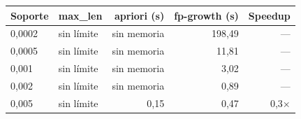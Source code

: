 \begin{tabular}{llrrr}
\toprule
\textbf{Soporte} & \textbf{max\_len} & \textbf{apriori (s)} & \textbf{fp-growth (s)} & \textbf{Speedup} \\
\midrule
0,0002 & sin límite & sin memoria & 198,49 & --- \\
0,0005 & sin límite & sin memoria & 11,81 & --- \\
0,001 & sin límite & sin memoria & 3,02 & --- \\
0,002 & sin límite & sin memoria & 0,89 & --- \\
0,005 & sin límite & 0,15 & 0,47 & 0,3× \\
\bottomrule
\end{tabular}
